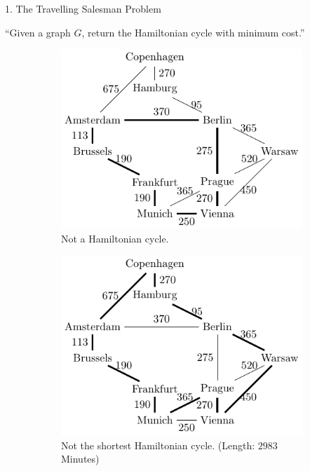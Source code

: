 \documentclass[]{templates/poster}
\begin{document}
\begin{frame}{}
\begin{columns}[t]
\begin{column}{0.422\linewidth}
\begin{block}{\Large 1. The Travelling Salesman Problem}
  \begin{center}
  ``Given a graph $G$, return the Hamiltonian cycle with minimum cost.''
  \begin{figure}
  \begin{subfigure}[t]{0.3\linewidth}
  \includegraphics[width=\linewidth]{not_hamiltonian}
  \caption{ Not a Hamiltonian cycle.}
  \end{subfigure}
  \begin{subfigure}[t]{0.3\linewidth}
  \includegraphics[width=\linewidth]{not_shortest}
  \caption{ Not the shortest Hamiltonian cycle. (Length: $2983$ Minutes)}
  \end{subfigure}
  \begin{subfigure}[t]{0.3\linewidth}

\end{subfigure}
\end{figure}
\end{center}
\end{block}
\end{column}
\end{columns}
\end{frame}
\end{document}
